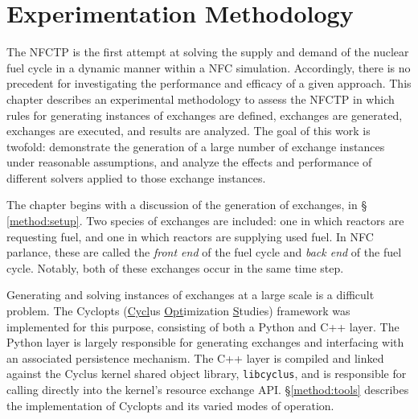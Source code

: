 \chapter{Experimentation Methodology}\label{ch:method}

The NFCTP is the first attempt at solving the supply and demand of the nuclear
fuel cycle in a dynamic manner within a NFC simulation. Accordingly, there is no
precedent for investigating the performance and efficacy of a given
approach. This chapter describes an experimental methodology to assess the NFCTP
in which rules for generating instances of exchanges are defined, exchanges are
generated, exchanges are executed, and results are analyzed. The goal of this
work is twofold: demonstrate the generation of a large number of exchange
instances under reasonable assumptions, and analyze the effects and performance
of different solvers applied to those exchange instances.

The chapter begins with a discussion of the generation of exchanges, in \S
\ref{method:setup}. Two species of exchanges are included: one in which reactors
are requesting fuel, and one in which reactors are supplying used fuel. In NFC
parlance, these are called the \textit{front end} of the fuel cycle and
\textit{back end} of the fuel cycle. Notably, both of these exchanges occur
in the same time step. 

Generating and solving instances of exchanges at a large scale is a difficult
problem. The Cyclopts (\underline{Cycl}us \underline{Opt}imization
\underline{S}tudies) framework was implemented for this purpose, consisting of
both a Python and C++ layer. The Python layer is largely responsible for
generating exchanges and interfacing with an associated persistence
mechanism. The C++ layer is compiled and linked against the Cyclus kernel shared
object library, \texttt{libcyclus}, and is responsible for calling directly into
the kernel's resource exchange API. \S \ref{method:tools} describes the
implementation of Cyclopts and its varied modes of operation.




